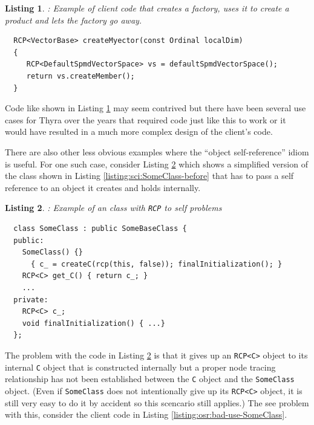 \documentclass[pdf,ps2pdf,11pt]{SANDreport}
\newtheorem{listing}{Listing}
\begin{document}
\begin{listing}: Example of client code that creates a factory, uses it to
create a product and lets the factory go away.  \\
\label{listing:osr:DefaultSpmdVectorSpace-use-delete}
{\small\begin{verbatim}
  RCP<VectorBase> createMyector(const Ordinal localDim)
  {
     RCP<DefaultSpmdVectorSpace> vs = defaultSpmdVectorSpace();
     return vs.createMember();
  }
\end{verbatim}}
\end{listing}


Code like shown in Listing
{}\ref{listing:osr:DefaultSpmdVectorSpace-use-delete} may seem
contrived but there have been several use cases for Thyra over the
years that required code just like this to work or it would have
resulted in a much more complex design of the client's code.

There are also other less obvious examples where the ``object
self-reference'' idiom is useful.  For one such case, consider Listing
{}\ref{listing:osr:SomeClass-before} which shows a simplified version
of the class shown in Listing {}\ref{listing:sci:SomeClass-before}
that has to pass a self reference to an object it creates and holds
internally.


\begin{listing}: Example of an class with {}\texttt{RCP} to self problems  \\
\label{listing:osr:SomeClass-before}
{\small\begin{verbatim}
  class SomeClass : public SomeBaseClass {
  public:
    SomeClass() {}
      { c_ = createC(rcp(this, false)); finalInitialization(); }
    RCP<C> get_C() { return c_; }
    ...
  private:
    RCP<C> c_;
    void finalInitialization() { ...}
  };
\end{verbatim}}
\end{listing}


The problem with the code in Listing
{}\ref{listing:osr:SomeClass-before} is that it gives up an
{}\texttt{RCP<C>} object to its internal {}\texttt{C} object that is
constructed internally but a proper node tracing relationship has not
been established between the {}\texttt{C} object and the
{}\texttt{SomeClass} object.  (Even if {}\texttt{SomeClass} does not
intentionally give up its {}\texttt{RCP<C>} object, it is still very
easy to do it by accident so this scencario still applies.)  The see
problem with this, consider the client code in Listing
{}\ref{listing:osr:bad-use-SomeClass}.
\end{document}
